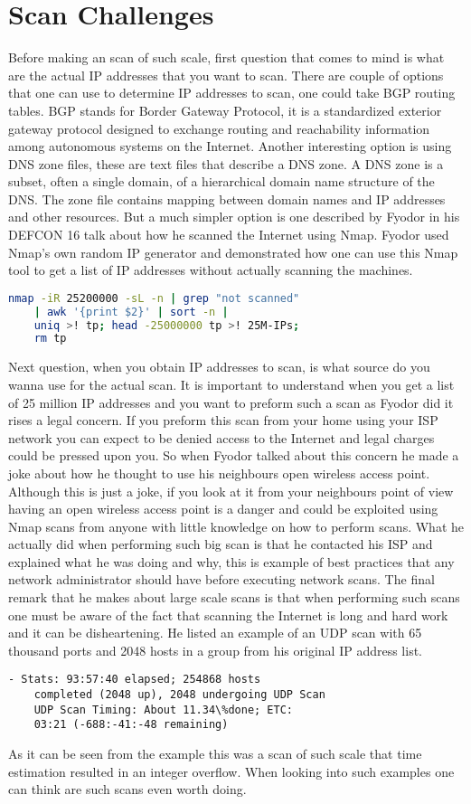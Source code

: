 \documentclass[times, utf8, seminar,english]{fer}
\begin{document}
\section{Scan Challenges}
Before making an scan of such scale, first question that comes to mind is what are the actual IP addresses that you want to scan. There are couple of options that one can use to determine IP addresses to scan, one could take BGP routing tables. BGP stands for Border Gateway Protocol, it is a standardized exterior gateway protocol designed to exchange routing and reachability information among autonomous systems on the Internet. Another interesting option is using DNS zone files, these are text files that describe a DNS zone. A DNS zone is a subset, often a single domain, of a hierarchical domain name structure of the DNS. The zone file contains mapping between domain names and IP addresses and other resources. But a much simpler option is one described by Fyodor in his DEFCON 16 talk about how he scanned the Internet using Nmap. Fyodor used Nmap's own random IP generator and demonstrated how one can use this Nmap tool to get a list of IP addresses without actually scanning the machines.
\begin{lstlisting}[language=bash, caption= Using Nmap to generate random IP addresses]
	nmap -iR 25200000 -sL -n | grep "not scanned" 
	| awk '{print $2}' | sort -n |
	uniq >! tp; head -25000000 tp >! 25M-IPs;
	rm tp
\end{lstlisting}
Next question, when you obtain IP addresses to scan, is what source do you wanna use for the actual scan. It is important to understand when you get a list of 25 million IP addresses and you want to preform such a scan as Fyodor did it rises a legal concern. If you preform this scan from your home using your ISP network you can expect to be denied access to the Internet and legal charges could be pressed upon you. So when Fyodor talked about this concern he made a joke about how he thought to use his neighbours open wireless access point. Although this is just a joke, if you look at it from your neighbours point of view having an open wireless access point is a danger and could be exploited using Nmap scans from anyone with little knowledge on how to perform scans. What he actually did when performing such big scan is that he contacted his ISP and explained what he was doing and why, this is example of best practices that any network administrator should have before executing network scans. The final remark that he makes about large scale scans is that when performing such scans one must be aware of the fact that scanning the Internet is long and hard work and it can be disheartening. He listed an example of an UDP scan with 65 thousand ports and 2048 hosts in a group from his original IP address list.
\begin{lstlisting}[caption=UDP Scan performance example]
	- Stats: 93:57:40 elapsed; 254868 hosts
	completed (2048 up), 2048 undergoing UDP Scan
	UDP Scan Timing: About 11.34\%done; ETC:
	03:21 (-688:-41:-48 remaining)
\end{lstlisting}
As it can be seen from the example this was a scan of such scale that time estimation resulted in an integer overflow. When looking into such examples one can think are such scans even worth doing.
\end{document}
